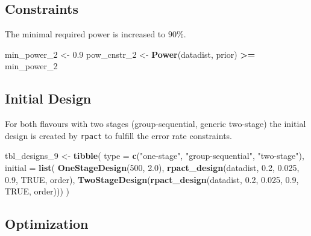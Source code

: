 \documentclass[
]{book}
\newenvironment{Shaded}{\begin{snugshade}}{\end{snugshade}}
\newcommand{\DataTypeTok}[1]{\textcolor[rgb]{0.13,0.29,0.53}{#1}}
\newcommand{\DecValTok}[1]{\textcolor[rgb]{0.00,0.00,0.81}{#1}}
\newcommand{\FloatTok}[1]{\textcolor[rgb]{0.00,0.00,0.81}{#1}}
\newcommand{\KeywordTok}[1]{\textcolor[rgb]{0.13,0.29,0.53}{\textbf{#1}}}
\newcommand{\NormalTok}[1]{#1}
\newcommand{\OperatorTok}[1]{\textcolor[rgb]{0.81,0.36,0.00}{\textbf{#1}}}
\newcommand{\OtherTok}[1]{\textcolor[rgb]{0.56,0.35,0.01}{#1}}
\newcommand{\StringTok}[1]{\textcolor[rgb]{0.31,0.60,0.02}{#1}}
\begin{document}
\hypertarget{constraints-8}{%
\subsection{Constraints}\label{constraints-8}}

The minimal required power is increased to \(90\%\).

\begin{Shaded}
\begin{Highlighting}[]
\NormalTok{min\_power\_}\DecValTok{2}\NormalTok{ \textless{}{-}}\StringTok{ }\FloatTok{0.9}
\NormalTok{pow\_cnstr\_}\DecValTok{2}\NormalTok{ \textless{}{-}}\StringTok{ }\KeywordTok{Power}\NormalTok{(datadist, prior) }\OperatorTok{\textgreater{}=}\StringTok{ }\NormalTok{min\_power\_}\DecValTok{2}
\end{Highlighting}
\end{Shaded}

\hypertarget{initial-design-6}{%
\subsection{Initial Design}\label{initial-design-6}}

For both flavours with two stages (group-sequential, generic two-stage)
the initial design is created by \texttt{rpact} to fulfill the error rate constraints.

\begin{Shaded}
\begin{Highlighting}[]
\NormalTok{tbl\_designs\_}\DecValTok{9}\NormalTok{ \textless{}{-}}\StringTok{ }\KeywordTok{tibble}\NormalTok{(}
    \DataTypeTok{type    =} \KeywordTok{c}\NormalTok{(}\StringTok{"one{-}stage"}\NormalTok{, }\StringTok{"group{-}sequential"}\NormalTok{, }\StringTok{"two{-}stage"}\NormalTok{),}
    \DataTypeTok{initial =} \KeywordTok{list}\NormalTok{(}
        \KeywordTok{OneStageDesign}\NormalTok{(}\DecValTok{500}\NormalTok{, }\FloatTok{2.0}\NormalTok{),}
        \KeywordTok{rpact\_design}\NormalTok{(datadist, }\FloatTok{0.2}\NormalTok{, }\FloatTok{0.025}\NormalTok{, }\FloatTok{0.9}\NormalTok{, }\OtherTok{TRUE}\NormalTok{, order),}
        \KeywordTok{TwoStageDesign}\NormalTok{(}\KeywordTok{rpact\_design}\NormalTok{(datadist, }\FloatTok{0.2}\NormalTok{, }\FloatTok{0.025}\NormalTok{, }\FloatTok{0.9}\NormalTok{, }\OtherTok{TRUE}\NormalTok{, order))) )}
\end{Highlighting}
\end{Shaded}

\hypertarget{optimization-7}{%
\subsection{Optimization}\label{optimization-7}}
\end{document}
